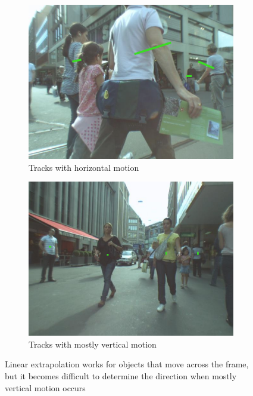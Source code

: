 \begin{figure}[ht]
	\begin{subfigure}[b]{.45\textwidth}
		\centering
		\includegraphics[width=1.0\linewidth]{img/chapter4_analysis/linExDirection.png}
		\caption{Tracks with horizontal motion}
	\end{subfigure}%
	\hspace{\fill} 
	\begin{subfigure}[b]{.45\textwidth}
		\centering
		\includegraphics[width=1.0\linewidth]{img/chapter4_analysis/linExDirectionAmb.png}
		\caption{Tracks with mostly vertical motion}
	\end{subfigure}
	\vspace{-1\baselineskip}
	\begin{center}
		\caption{Linear extrapolation works for objects that move across the frame, but it becomes difficult to determine the direction when mostly vertical motion occurs}
		\label{fig:linExProblem}
	\end{center}
	\vspace{-2\baselineskip}
\end{figure}

